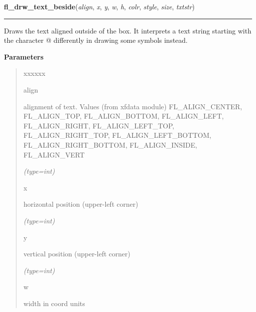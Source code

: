     \label{xformslib:flbasic:fl_drw_text_beside}

    \vspace{0.5ex}

\hspace{.8\funcindent}\begin{boxedminipage}{\funcwidth}

    \raggedright \textbf{fl\_drw\_text\_beside}(\textit{align}, \textit{x}, \textit{y}, \textit{w}, \textit{h}, \textit{colr}, \textit{style}, \textit{size}, \textit{txtstr})

    \vspace{-1.5ex}

    \rule{\textwidth}{0.5\fboxrule}
\setlength{\parskip}{2ex}
    Draws the text aligned outside of the box. It interprets a text string 
    starting with the character @ differently in drawing some symbols 
    instead.

\setlength{\parskip}{1ex}
      \textbf{Parameters}
      \vspace{-1ex}

      \begin{quote}
        \begin{Ventry}{xxxxxx}

          \item[align]

          alignment of text. Values (from xfdata module) FL\_ALIGN\_CENTER,
          FL\_ALIGN\_TOP, FL\_ALIGN\_BOTTOM, FL\_ALIGN\_LEFT, 
          FL\_ALIGN\_RIGHT, FL\_ALIGN\_LEFT\_TOP, FL\_ALIGN\_RIGHT\_TOP, 
          FL\_ALIGN\_LEFT\_BOTTOM, FL\_ALIGN\_RIGHT\_BOTTOM, 
          FL\_ALIGN\_INSIDE, FL\_ALIGN\_VERT

            {\it (type=int)}

          \item[x]

          horizontal position (upper-left corner)

            {\it (type=int)}

          \item[y]

          vertical position (upper-left corner)

            {\it (type=int)}

          \item[w]

          width in coord units


\end{Ventry}
\end{quote}
\end{boxedminipage}
